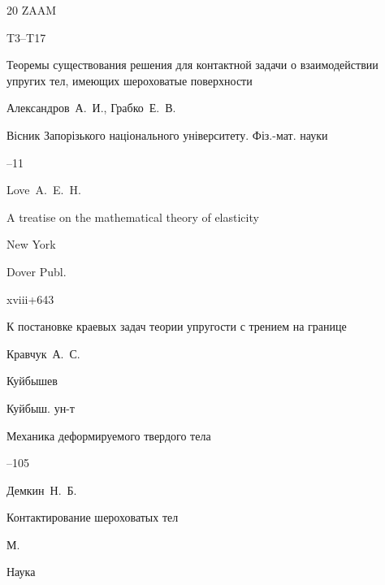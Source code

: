 \begin{thebibliography}{20}
\jour ZAAM




\pages T3--T17





\paper Теоремы существования решения для контактной задачи о взаимодействии упругих тел, имеющих шероховатые поверхности

\by Александров~А.~И., Грабко~Е.~В.

\jour Вісник Запорізького національного університету. Фіз.-мат. науки



--11






\by Love~A.~E.~H.

\book A treatise on the mathematical theory of elasticity

\publaddr New York

\publ Dover Publ.

\totalpages  xviii+643 





\paper К постановке краевых задач теории упругости с трением на границе

\by Кравчук~А.~С.

\publaddr Куйбышев

\publ Куйбыш. ун-т

\inbook Механика деформируемого твердого тела


--105




\by Демкин~Н.~Б.

\book Контактирование шероховатых тел

\publaddr  М.

\publ Наука







\end{thebibliography}
